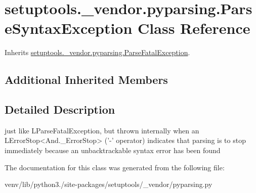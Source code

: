 \hypertarget{classsetuptools_1_1__vendor_1_1pyparsing_1_1_parse_syntax_exception}{}\section{setuptools.\+\_\+vendor.\+pyparsing.\+Parse\+Syntax\+Exception Class Reference}
\label{classsetuptools_1_1__vendor_1_1pyparsing_1_1_parse_syntax_exception}


Inherits \hyperlink{classsetuptools_1_1__vendor_1_1pyparsing_1_1_parse_fatal_exception}{setuptools.\+\_\+vendor.\+pyparsing.\+Parse\+Fatal\+Exception}.

\subsection*{Additional Inherited Members}


\subsection{Detailed Description}
\begin{DoxyVerb}just like L{ParseFatalException}, but thrown internally when an
   L{ErrorStop<And._ErrorStop>} ('-' operator) indicates that parsing is to stop 
   immediately because an unbacktrackable syntax error has been found\end{DoxyVerb}
 

The documentation for this class was generated from the following file\+:\begin{DoxyCompactItemize}
\item 
venv/lib/python3./site-\/packages/setuptools/\+\_\+vendor/pyparsing.\+py\end{DoxyCompactItemize}

